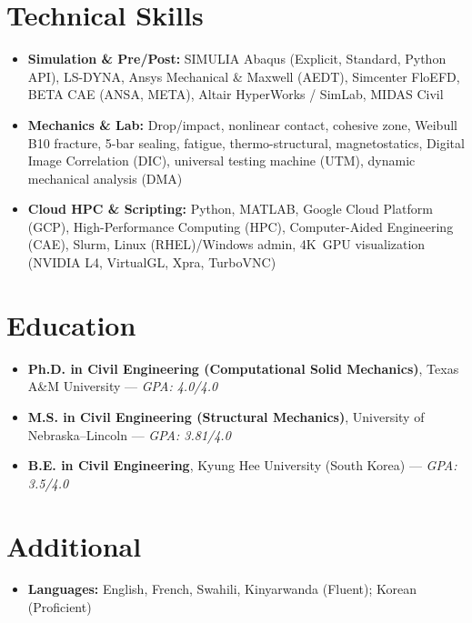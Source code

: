 \documentclass[10pt,letterpaper]{article}
\begin{document}
\section*{Technical Skills}
\begin{itemize}
  \item \textbf{Simulation \& Pre/Post:} SIMULIA Abaqus (Explicit, Standard, Python API), LS-DYNA, Ansys Mechanical \& Maxwell (AEDT), Simcenter FloEFD, BETA CAE (ANSA, META), Altair HyperWorks / SimLab, MIDAS Civil
  \item \textbf{Mechanics \& Lab:} Drop/impact, nonlinear contact, cohesive zone, Weibull B10 fracture, 5-bar sealing, fatigue, thermo-structural, magnetostatics, Digital Image Correlation (DIC), universal testing machine (UTM), dynamic mechanical analysis (DMA)
  \item \textbf{Cloud HPC \& Scripting:} Python, MATLAB, Google Cloud Platform (GCP), High-Performance Computing (HPC), Computer-Aided Engineering (CAE), Slurm, Linux (RHEL)/Windows admin, 4K~GPU visualization (NVIDIA L4, VirtualGL, Xpra, TurboVNC)
\end{itemize}

\section*{Education}
\begin{itemize}
  \item \textbf{Ph.D. in Civil Engineering (Computational Solid Mechanics)}, Texas A\&M University --- \textit{GPA: 4.0/4.0}
  \item \textbf{M.S. in Civil Engineering (Structural Mechanics)}, University of Nebraska--Lincoln --- \textit{GPA: 3.81/4.0}
  \item \textbf{B.E. in Civil Engineering}, Kyung Hee University (South Korea) --- \textit{GPA: 3.5/4.0}
\end{itemize}

\section*{Additional}
\begin{itemize}
  \item \textbf{Languages:} English, French, Swahili, Kinyarwanda (Fluent); Korean (Proficient)
\end{itemize}
\end{document}
